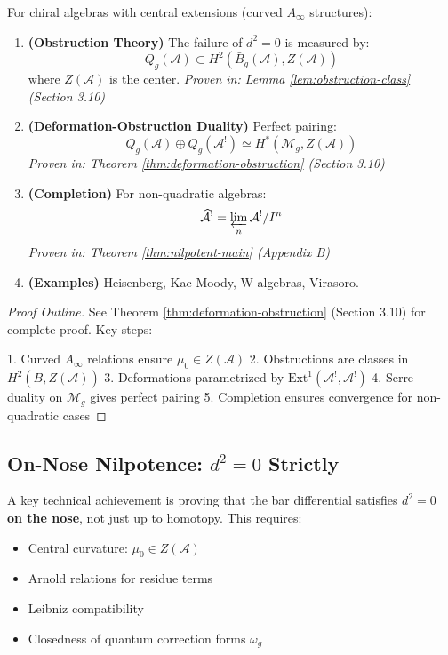 \begin{maintheorem}\label{mainthm:curved-complete}
For chiral algebras with central extensions (curved $A_\infty$ structures):

\begin{enumerate}
\item \textbf{(Obstruction Theory)} The failure of $d^2 = 0$ is measured by:
$$Q_g(\mathcal{A}) \subset H^2(\bar{B}_g(\mathcal{A}), Z(\mathcal{A}))$$
where $Z(\mathcal{A})$ is the center.
\textit{Proven in: Lemma \ref{lem:obstruction-class} (Section 3.10)}

\item \textbf{(Deformation-Obstruction Duality)} Perfect pairing:
$$Q_g(\mathcal{A}) \oplus Q_g(\mathcal{A}^!) \simeq H^*(\mathcal{M}_g, Z(\mathcal{A}))$$
\textit{Proven in: Theorem \ref{thm:deformation-obstruction} (Section 3.10)}

\item \textbf{(Completion)} For non-quadratic algebras:
$$\widehat{\mathcal{A}}^! = \varprojlim_n \mathcal{A}^! / I^n$$
\textit{Proven in: Theorem \ref{thm:nilpotent-main} (Appendix B)}

\item \textbf{(Examples)} Heisenberg, Kac-Moody, W-algebras, Virasoro.
\end{enumerate}
\end{maintheorem}

\begin{proof}[Proof Outline]
See Theorem \ref{thm:deformation-obstruction} (Section 3.10) for complete proof. 
Key steps:

1. Curved $A_\infty$ relations ensure $\mu_0 \in Z(\mathcal{A})$
2. Obstructions are classes in $H^2(\bar{B}, Z(\mathcal{A}))$
3. Deformations parametrized by $\text{Ext}^1(\mathcal{A}^!, \mathcal{A}^!)$
4. Serre duality on $\mathcal{M}_g$ gives perfect pairing
5. Completion ensures convergence for non-quadratic cases
\end{proof}


\subsection{On-Nose Nilpotence: $d^2 = 0$ Strictly}

A key technical achievement is proving that the bar differential satisfies $d^2 = 0$ 
\textbf{on the nose}, not just up to homotopy. This requires:
\begin{itemize}
\item Central curvature: $\mu_0 \in Z(\mathcal{A})$
\item Arnold relations for residue terms
\item Leibniz compatibility
\item Closedness of quantum correction forms $\omega_g$
\end{itemize}

